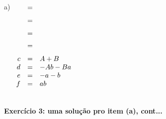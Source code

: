 \documentclass[oneside,12pt]{article}
\begin{document}
\msk

a) $\scalebox{1.0}{$
    \begin{array}[t]{rcl}
      \ga{f1} &=& \ga{f3}   \\[7pt]
      \ga{f1} &=& \ga{f1.5} \\[6pt]
              &=& \ga{f1.6} \\[6pt]
              &=& \ga{f2}   \\[7pt]
            c &=& A+B    \\
            d &=& -Ab-Ba \\
            e &=& -a-b   \\
            f &=& ab     \\[15pt]
    \end{array}
    $}
   $

\newpage

{\bf Exercício 3: uma solução pro item (a), cont...}
\end{document}
